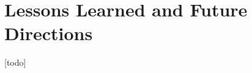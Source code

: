 \FloatBarrier
\section{Lessons Learned and Future Directions} 
\label{sec:lessons-learned}

[todo]

% 	
